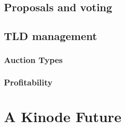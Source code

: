 \documentclass[runningheads]{llncs}
\begin{document}
\subsection{Proposals and voting}
\subsection{TLD management}
\subsubsection{Auction Types}
\subsubsection{Profitability}
%
%
%
\section{A Kinode Future}
%
%
%
% 
% 
%
%
%
%
%
\end{document}
